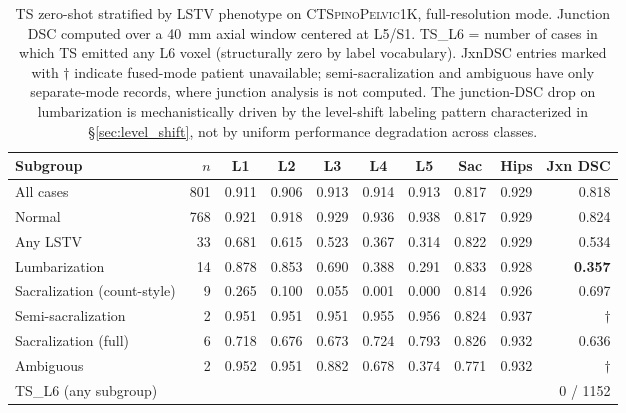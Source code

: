 \documentclass{article}
\newcommand{\dataset}{\textsc{CTSpinoPelvic1K}}
\begin{document}
\begin{table}[t]
\caption{TS{} zero-shot stratified by LSTV phenotype on
\dataset{}, full-resolution mode.
Junction DSC computed over a 40~mm axial window centered at
L5/S1.
\textsc{TS\_L6} = number of cases in which TS emitted any L6
voxel (structurally zero by label vocabulary).
JxnDSC entries marked with $\dagger$ indicate fused-mode patient
unavailable; semi-sacralization and ambiguous have only
separate-mode records, where junction analysis is not computed.
The junction-DSC drop on lumbarization is mechanistically driven
by the level-shift labeling pattern characterized in
\S\ref{sec:level_shift}, not by uniform performance degradation
across classes.}
\label{tab:ts_stratified}
\centering
\small
\begin{tabular}{lrcccccccr}
\toprule
\bfseries Subgroup & \bfseries $n$ &
\bfseries L1 & \bfseries L2 & \bfseries L3 & \bfseries L4 & \bfseries L5 &
\bfseries Sac & \bfseries Hips &
\bfseries Jxn DSC \\
\midrule
All cases                              & 801 & 0.911 & 0.906 & 0.913 & 0.914 & 0.913 & 0.817 & 0.929 & 0.818 \\
Normal                                 & 768 & 0.921 & 0.918 & 0.929 & 0.936 & 0.938 & 0.817 & 0.929 & 0.824 \\
\midrule
Any LSTV                               & 33  & 0.681 & 0.615 & 0.523 & 0.367 & 0.314 & 0.822 & 0.929 & 0.534 \\
\quad Lumbarization                    & 14  & 0.878 & 0.853 & 0.690 & 0.388 & 0.291 & 0.833 & 0.928 & \textbf{0.357} \\
\quad Sacralization (count-style)      &  9  & 0.265 & 0.100 & 0.055 & 0.001 & 0.000 & 0.814 & 0.926 & 0.697 \\
\quad Semi-sacralization               &  2  & 0.951 & 0.951 & 0.951 & 0.955 & 0.956 & 0.824 & 0.937 & $\dagger$ \\
\quad Sacralization (full)             &  6  & 0.718 & 0.676 & 0.673 & 0.724 & 0.793 & 0.826 & 0.932 & 0.636 \\
\quad Ambiguous                        &  2  & 0.952 & 0.951 & 0.882 & 0.678 & 0.374 & 0.771 & 0.932 & $\dagger$ \\
\midrule
\textsc{TS\_L6} (any subgroup)         &     &       &       &       &       &       &       &       & 0 / 1152 \\
\bottomrule
\end{tabular}
\end{table}
\end{document}

